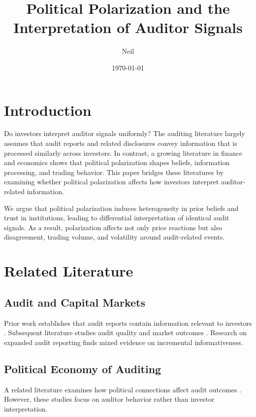 \documentclass[12pt]{article}
\title{Political Polarization and the Interpretation of Auditor Signals}
\author{Neil}
\date{\today}
\begin{document}
\maketitle
\onehalfspacing

\section{Introduction}

Do investors interpret auditor signals uniformly? The auditing literature largely assumes that audit reports and related disclosures convey information that is processed similarly across investors. In contrast, a growing literature in finance and economics shows that political polarization shapes beliefs, information processing, and trading behavior. This paper bridges these literatures by examining whether political polarization affects how investors interpret auditor-related information.

We argue that political polarization induces heterogeneity in prior beliefs and trust in institutions, leading to differential interpretation of identical audit signals. As a result, polarization affects not only price reactions but also disagreement, trading volume, and volatility around audit-related events.

\section{Related Literature}

\subsection{Audit and Capital Markets}

Prior work establishes that audit reports contain information relevant to investors \citep{firth1978,dodd1984}. Subsequent literature studies audit quality and market outcomes \citep{francis2004,defond2014}. Research on expanded audit reporting finds mixed evidence on incremental informativeness.

\subsection{Political Economy of Auditing}

A related literature examines how political connections affect audit outcomes \citep{chan2006}. However, these studies focus on auditor behavior rather than investor interpretation.
\end{document}
